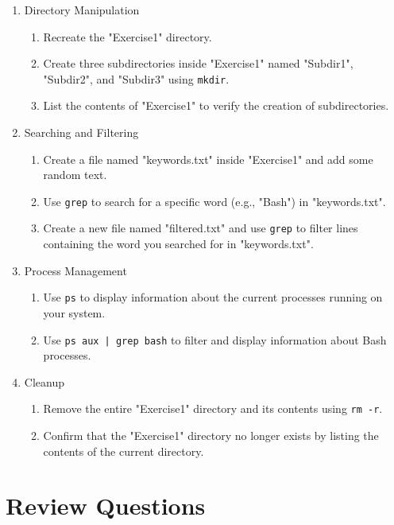 \begin{exercisebox}
\begin{enumerate}
\begin{enumerate}
\end{enumerate}
\item Directory Manipulation
\begin{enumerate}
	\item Recreate the "Exercise1" directory.
	\item Create three subdirectories inside "Exercise1" named "Subdir1", "Subdir2", and "Subdir3" using \texttt{mkdir}.
	\item List the contents of "Exercise1" to verify the creation of subdirectories.
\end{enumerate}
\item Searching and Filtering
\begin{enumerate}
	\item Create a file named "keywords.txt" inside "Exercise1" and add some random text.
	\item Use \texttt{grep} to search for a specific word (e.g., "Bash") in "keywords.txt".
	\item Create a new file named "filtered.txt" and use \texttt{grep} to filter lines containing the word you searched for in "keywords.txt".
\end{enumerate}
\item Process Management
\begin{enumerate}
	\item Use \texttt{ps} to display information about the current processes running on your system.
	\item Use \texttt{ps aux | grep bash} to filter and display information about Bash processes.
\end{enumerate}
\item Cleanup
\begin{enumerate}
	\item Remove the entire "Exercise1" directory and its contents using \texttt{rm -r}.
	\item Confirm that the "Exercise1" directory no longer exists by listing the contents of the current directory.
\end{enumerate}
\end{enumerate}
\end{exercisebox}

\section{Review Questions}

